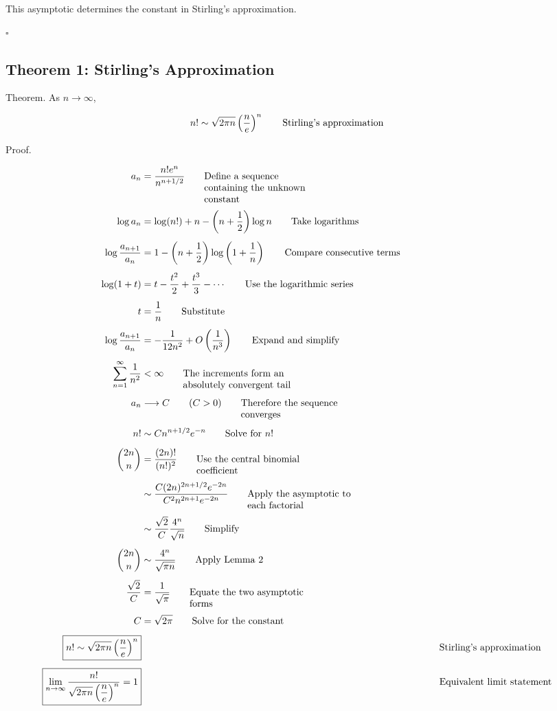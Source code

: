 \documentclass{article}
\newcommand{\justwidth}{0.36\textwidth}
\newcommand{\just}[1]{\parbox[t]{\justwidth}{\raggedright #1}}
\newlength{\defaultparwidth}
\newcommand{\defaultwidthpar}[1]{%
  \par
  \noindent\hfill
  \begin{minipage}{\defaultparwidth}%
  #1%
  \end{minipage}%
  \hfill\null
  \par
}
\begin{document}
\defaultwidthpar{This asymptotic determines the constant in Stirling's approximation.}

$\square$

\subsection{Theorem 1: Stirling's Approximation}
Theorem. As $n\rightarrow\infty$,

\begin{align*}
n!
&\sim
\sqrt{2\pi n}
\left(
\frac{n}{e}
\right)^n
\tag*{\just{Stirling's approximation}}
\end{align*}

Proof.

\begin{align*}
a_n
&=
\frac{n!e^n}{n^{n+1/2}}
\tag*{\just{Define a sequence containing the unknown constant}}
\\[0.45em]
\log a_n
&=
\log(n!)
+
n
-
\left(
n+\frac{1}{2}
\right)
\log n
\tag*{\just{Take logarithms}}
\\[0.45em]
\log\frac{a_{n+1}}{a_n}
&=
1
-
\left(
n+\frac{1}{2}
\right)
\log\left(
1+\frac{1}{n}
\right)
\tag*{\just{Compare consecutive terms}}
\\[0.45em]
\log(1+t)
&=
t-\frac{t^2}{2}
+\frac{t^3}{3}
-\cdots
\tag*{\just{Use the logarithmic series}}
\\[0.45em]
t
&=
\frac{1}{n}
\tag*{\just{Substitute}}
\\[0.45em]
\log\frac{a_{n+1}}{a_n}
&=
-\frac{1}{12n^2}
+
O\left(
\frac{1}{n^3}
\right)
\tag*{\just{Expand and simplify}}
\\[0.45em]
\sum_{n=1}^{\infty}
\frac{1}{n^2}
&<
\infty
\tag*{\just{The increments form an absolutely convergent tail}}
\\[0.45em]
a_n
&\longrightarrow
C
\qquad
(C>0)
\tag*{\just{Therefore the sequence converges}}
\\[0.45em]
n!
&\sim
C
n^{n+1/2}
e^{-n}
\tag*{\just{Solve for $n!$}}
\\[0.45em]
\binom{2n}{n}
&=
\frac{(2n)!}{(n!)^2}
\tag*{\just{Use the central binomial coefficient}}
\\[0.45em]
&\sim
\frac{
C(2n)^{2n+1/2}e^{-2n}
}{
C^2n^{2n+1}e^{-2n}
}
\tag*{\just{Apply the asymptotic to each factorial}}
\\[0.45em]
&\sim
\frac{\sqrt{2}}{C}
\frac{4^n}{\sqrt{n}}
\tag*{\just{Simplify}}
\\[0.45em]
\binom{2n}{n}
&\sim
\frac{4^n}{\sqrt{\pi n}}
\tag*{\just{Apply Lemma 2}}
\\[0.45em]
\frac{\sqrt{2}}{C}
&=
\frac{1}{\sqrt{\pi}}
\tag*{\just{Equate the two asymptotic forms}}
\\[0.45em]
C
&=
\sqrt{2\pi}
\tag*{\just{Solve for the constant}}
\\[0.45em]
\boxed{
n!
\sim
\sqrt{2\pi n}
\left(
\frac{n}{e}
\right)^n
}
&&
\tag*{\just{Stirling's approximation}}
\\[0.45em]
\boxed{
\lim_{n\to\infty}
\frac{
n!
}{
\sqrt{2\pi n}
\left(
\dfrac{n}{e}
\right)^n
}
=
1
}
&&
\tag*{\just{Equivalent limit statement}}
\end{align*}
\end{document}

